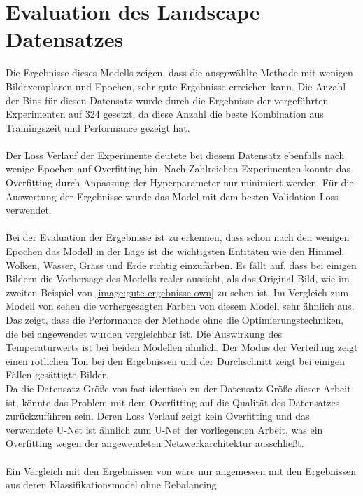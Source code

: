 \section{Evaluation des Landscape Datensatzes}
Die Ergebnisse dieses Modells zeigen, dass die ausgewählte Methode mit wenigen Bildexemplaren und Epochen, sehr gute Ergebnisse erreichen kann.
Die Anzahl der Bins für diesen Datensatz wurde durch die Ergebnisse der vorgeführten Experimenten auf 324 gesetzt, da diese Anzahl die beste Kombination
aus Trainingszeit und Performance gezeigt hat.
\\
\\
Der Loss Verlauf der Experimente deutete bei diesem Datensatz ebenfalls nach wenige Epochen auf Overfitting hin. Nach Zahlreichen Experimenten
konnte das Overfitting durch Anpassung der Hyperparameter nur minimiert werden. Für die Auswertung der Ergebnisse wurde das Model mit dem besten
Validation Loss verwendet.
\\
\\
Bei der Evaluation der Ergebnisse ist zu erkennen, dass schon nach den wenigen Epochen das Modell in der Lage ist die wichtigsten Entitäten wie den Himmel, Wolken, Wasser,
Grass und Erde richtig einzufärben. Es fällt auf, dass bei einigen Bildern die Vorhersage des Modells realer aussieht, als das Original Bild,
wie im zweiten Beispiel von \ref{image:gute-ergebnisse-own} zu sehen ist. Im Vergleich zum Modell von \cite{billaut2018colorunet} sehen die vorhergesagten 
Farben von diesem Modell sehr ähnlich aus. Das zeigt, dass die Performance der Methode ohne die Optimierungstechniken, die bei \cite{billaut2018colorunet}
angewendet wurden vergleichbar ist. Die Auswirkung des Temperaturwerts ist bei beiden Modellen ähnlich. Der Modus der Verteilung zeigt einen rötlichen Ton bei den
Ergebnissen und der Durchschnitt zeigt bei einigen Fällen gesättigte Bilder. %
\\
Da die Datensatz Größe von \cite{billaut2018colorunet} fast identisch zu der Datensatz Größe dieser Arbeit ist, könnte das Problem mit dem Overfitting
auf die Qualität des Datensatzes zurückzuführen sein. Deren Loss Verlauf zeigt kein Overfitting und das verwendete U-Net ist ähnlich zum
U-Net der vorliegenden Arbeit, was ein Overfitting wegen der angewendeten Netzwerkarchitektur ausschließt. %
\\
\\
Ein Vergleich mit den Ergebnissen von \cite{zhang2016colorful} wäre nur angemessen mit den Ergebnissen aus deren Klassifikationsmodel ohne Rebalancing.

